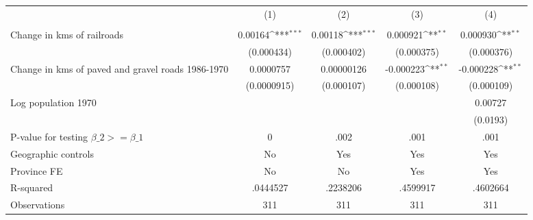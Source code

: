 {
\def\sym#1{\ifmmode^{#1}\else\(^{#1}\)\fi}
\begin{tabular}{l*{4}{c}}
\hline\hline
                &\multicolumn{1}{c}{(1)}&\multicolumn{1}{c}{(2)}&\multicolumn{1}{c}{(3)}&\multicolumn{1}{c}{(4)}\\
                &\multicolumn{1}{c}{}&\multicolumn{1}{c}{}&\multicolumn{1}{c}{}&\multicolumn{1}{c}{}\\
\hline
Change in kms of railroads&  0.00164\sym{***}&  0.00118\sym{***}& 0.000921\sym{**} & 0.000930\sym{**} \\
                &(0.000434)         &(0.000402)         &(0.000375)         &(0.000376)         \\
[1em]
Change in kms of paved and gravel roads 1986-1970&0.0000757         &0.00000126         &-0.000223\sym{**} &-0.000228\sym{**} \\
                &(0.0000915)         &(0.000107)         &(0.000108)         &(0.000109)         \\
[1em]
Log population 1970&                  &                  &                  &  0.00727         \\
                &                  &                  &                  & (0.0193)         \\
\hline
P-value for testing $\beta\_{2} >= \beta\_{1}$&        0         &     .002         &     .001         &     .001         \\
Geographic controls&       No         &      Yes         &      Yes         &      Yes         \\
Province FE     &       No         &       No         &      Yes         &      Yes         \\
R-squared       & .0444527         & .2238206         & .4599917         & .4602664         \\
Observations    &      311         &      311         &      311         &      311         \\
\hline\hline
\end{tabular}
}
